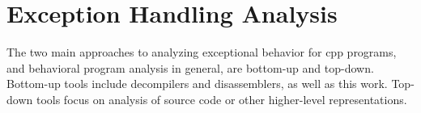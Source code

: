 \begin{comment}
  \subsection{Automata Learning}\label{related-automata}
  Automata learning algorithms are a different approach to state machine extraction.
  They perform black-box testing in order to \emph{learn} the behavior of a system \autocite{steffen2011active}.
  For example, \textcite{fiter2017ssh} used automata learning to infer the functionality of three \ac{ssh} server implementations.
  Their learning methodology was based on LearnLib \autocite{raffelt2005learnlib}, an automata learning library.
  Automata learning typically produces abstract high-level models concerning the in/output relations at the protocol level.
  Their \emph{mapper}, which maps back and forth from abstract inputs/outputs to concrete packages to be sent to/received from the server,
  was based on the Paramiko \autocite{paramiko} \ac{ssh} client implementation.

  \Textcite{kerkers2017assessing} performed security analysis
  of power distribution \acp{ics} using automata learning.
  LearnLib was again used to provide the necessary learning features.
  In addition to implementing a mapper to support the necessary \ac{ics}
  protocols, Kerkers also had to provide software and hardware testing interfaces for the physical \acp{ics} that were under test.

  Automata learning techniques can be used to infer state machines when source code is not available.
  However, they do not provide formal statements of overapproximation.
  They also require development of a \emph{mapper}, which translates between the learner and the black box.
  Developing such a mapper is a significant per-binary manual effort.
  Its implementation has a severe impact on the validity of the inferred state machine.
  In contrast, our disassembly approach does not require such manual effort.
\end{comment}

\section{Exception Handling Analysis}\label{related-exceptions}
The two main approaches to analyzing exceptional behavior for \gls{cpp} programs, and behavioral program analysis in general, are bottom-up and top-down.
Bottom-up tools include decompilers and disassemblers, as well as this work.
Top-down tools focus on analysis of source code or other higher-level representations.

